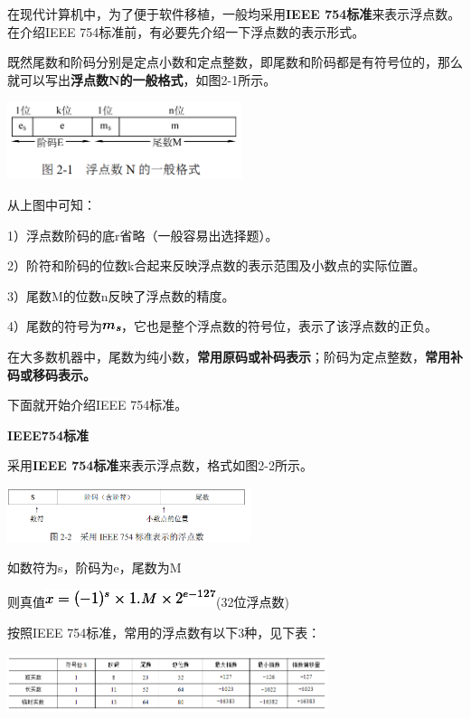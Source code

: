 在现代计算机中，为了便于软件移植，一般均采用\textbf{IEEE
754标准}来表示浮点数。在介绍IEEE
754标准前，有必要先介绍一下浮点数的表示形式。

既然尾数和阶码分别是定点小数和定点整数，即尾数和阶码都是有符号位的，那么就可以写出\textbf{浮点数N的一般格式}，如图2-1所示。

\includegraphics[width=2.70833in,height=0.89583in]{png-jpeg-pics/6FE5A2B6C1359E9800E06FB67C945377.png}

从上图中可知：

{1）}{浮点数阶码的底r省略（一般容易出选择题）。}

{2）}{阶符和阶码的位数k合起来反映浮点数的表示范围及小数点的实际位置。}

{3）}{尾数M的位数n反映了浮点数的精度。}

{4）}尾数的符号为\includegraphics[width=0.21875in,height=0.09375in]{texmath/88c831ms}，它也是整个浮点数的符号位，表示了该浮点数的正负。

在大多数机器中，尾数为纯小数，\textbf{常用原码或补码表示}；阶码为定点整数，\textbf{常用补码或移码表示。}

下面就开始介绍IEEE 754标准。

{\textbf{IEEE754标准}}

采用{\textbf{IEEE 754标准}}来表示浮点数，格式如图2-2所示。

\includegraphics[width=2.80208in,height=0.63542in]{png-jpeg-pics/752F41641C8EDCD76B34C5208BE4D47F.png}

如数符为s，阶码为e，尾数为M

则真值\includegraphics[width=1.96875in,height=0.19792in]{texmath/ccaf64x(-1)stimes1Mtimes2e-127}(32位浮点数)

按照IEEE 754标准，常用的浮点数有以下3种，见下表：

\includegraphics[width=3.69792in,height=0.66667in]{png-jpeg-pics/3D7EB7881E3EFD61FA1063F3DC8A777B.png}
